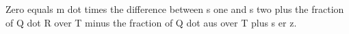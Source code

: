 Zero equals m dot times the difference between s one and s two plus the fraction of Q dot R over T minus the fraction of Q dot aus over T plus s er z.